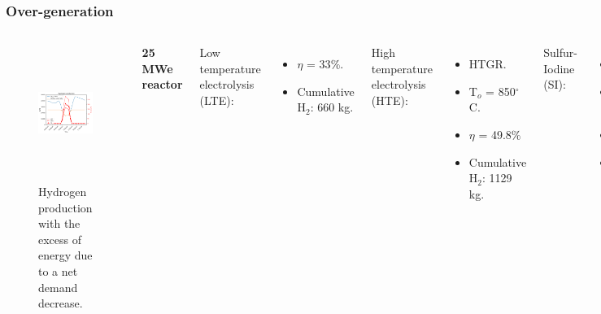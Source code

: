 \begin{frame}
\frametitle{Over-generation}
\begin{columns}
    \column[t]{5.5cm}
	\begin{figure}[htbp!]
		\begin{center}
			\includegraphics[height=4.4cm]{images/uiuc-hydro2B}
		\end{center}
		\caption{Hydrogen production with the excess of energy due to a net demand decrease.}
	\end{figure}

    \column[t]{5.5cm}
    \textbf{25 MWe reactor} \vspace{0.2cm}

    Low temperature electrolysis (LTE):
    \begin{itemize}
 		\item $\eta$ = 33$\%$.
 		\item Cumulative H$_2$: 660 kg.
 	\end{itemize}

    High temperature electrolysis (HTE):
    \begin{itemize}
 		\item HTGR.
 		\item T$_o$ = 850$^\circ$C.
 		\item $\eta$ = 49.8$\%$
 		\item Cumulative H$_2$: 1129 kg.
 	\end{itemize}

    Sulfur-Iodine (SI):
    \begin{itemize}
 		\item HTGR.
 		\item T$_o$ = 850$^\circ$C.
 		\item $\eta$ = 49.8$\%$
 		\item Cumulative H$_2$: 815 kg.
 	\end{itemize}

\end{columns}
\end{frame}


